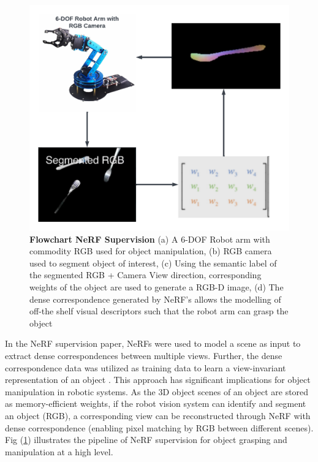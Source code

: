 \documentclass[conference]{IEEEtran}
\begin{document}
\begin{figure} [h]
\centering
  \includegraphics[scale = 0.45]{figures/introduction/flowchart_nerf_supervision.png}
  \caption{\label{fig:Flowchart} \textbf{Flowchart NeRF Supervision} (a) A 6-DOF Robot arm with commodity RGB used for object manipulation, (b) RGB camera used to segment object of interest, (c) Using the semantic label of the segmented RGB + Camera View direction, corresponding weights of the object are used to generate a RGB-D image, (d) The dense correspondence generated by NeRF's allows the modelling of off-the shelf visual descriptors such that the robot arm can grasp the object}
\end{figure}

In the NeRF supervision paper, NeRFs were used to model a scene as input to extract dense correspondences between multiple views. Further, the dense correspondence data was utilized as training data to learn a view-invariant representation of an object \cite{yen2022nerfsupervision} \cite{florencemanuelli2018dense}. This approach has significant implications for object manipulation in robotic systems. As the 3D object scenes of an object are stored as memory-efficient weights, if the robot vision system can identify and segment an object  (RGB), a corresponding view can be reconstructed through NeRF with dense correspondence (enabling pixel matching by RGB between different scenes). Fig (\ref{fig:Flowchart}) illustrates the pipeline of NeRF supervision for object grasping and manipulation at a high level. \vspace{2mm}
\end{document}
